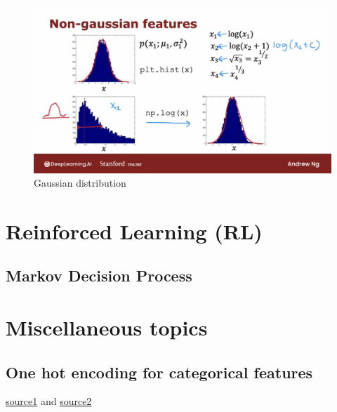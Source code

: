 \documentclass[12pt]{report}
\begin{document}
\begin{figure}[H]
  \centering
  \includegraphics[trim =0.0cm 0.0cm 0.0cm 0.0cm, clip, scale=0.15]{pics/convertToGaussian.png}
  \caption{Gaussian distribution}
\end{figure}




\chapter[Reinforced Learning]{Reinforced Learning (RL)}

\section{Markov Decision Process}

\chapter[Miscellaneous topics]{Miscellaneous topics}

\section{One hot encoding for categorical features}
\label{sec:one-hot}

\href{https://www.youtube.com/watch?v=v_4KWmkwmsU&ab_channel=deeplizard}{source1} and \href{https://machinelearningmastery.com/how-to-one-hot-encode-sequence-data-in-python/}{source2}
\end{document}
